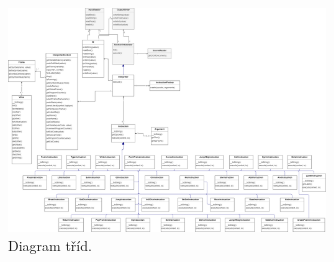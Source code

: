 \documentclass[11pt, letterpaper]{article}
\begin{document}
\begin{figure}[h]
  \centering
  \includegraphics[width=0.75\textwidth]{diagram.png}
  \caption{Diagram tříd.}
  \label{fig:diagram}
\end{figure}
\end{document}
